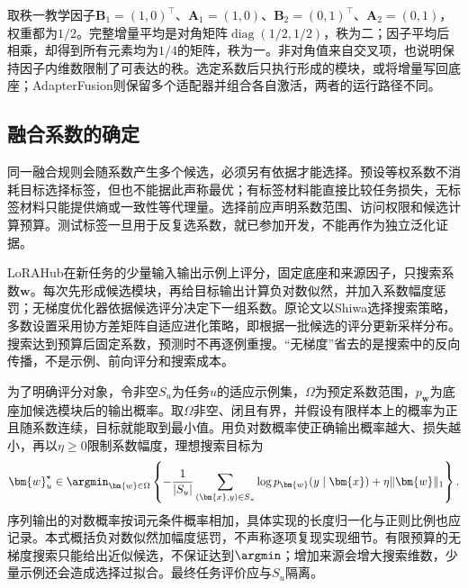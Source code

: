 取秩一教学因子$\bm{B}_1=(1,0)^\top$、$\bm{A}_1=(1,0)$、$\bm{B}_2=(0,1)^\top$、$\bm{A}_2=(0,1)$，权重都为$1/2$。完整增量平均是对角矩阵$\operatorname{diag}(1/2,1/2)$，秩为二；因子平均后相乘，却得到所有元素均为$1/4$的矩阵，秩为一。非对角值来自交叉项，也说明保持因子内维数限制了可表达的秩。选定系数后只执行形成的模块，或将增量写回底座；AdapterFusion则保留多个适配器并组合各自激活，两者的运行路径不同。

\subsection{融合系数的确定}
\label{sec:ket-integration-coefficients}

同一融合规则会随系数产生多个候选，必须另有依据才能选择。预设等权系数不消耗目标选择标签，但也不能据此声称最优；有标签材料能直接比较任务损失，无标签材料只能提供熵或一致性等代理量。选择前应声明系数范围、访问权限和候选计算预算。测试标签一旦用于反复选系数，就已参加开发，不能再作为独立泛化证据。

LoRAHub在新任务的少量输入输出示例上评分，固定底座和来源因子，只搜索系数$\bm{w}$。每次先形成候选模块，再给目标输出计算负对数似然，并加入系数幅度惩罚；无梯度优化器依据候选评分决定下一组系数。原论文以Shiwa选择搜索策略，多数设置采用协方差矩阵自适应进化策略，即根据一批候选的评分更新采样分布。搜索达到预算后固定系数，预测时不再逐例重搜。“无梯度”省去的是搜索中的反向传播，不是示例、前向评分和搜索成本。

为了明确评分对象，令非空$S_u$为任务$u$的适应示例集，$\Omega$为预定系数范围，$p_{\bm{w}}$为底座加候选模块后的输出概率。取$\Omega$非空、闭且有界，并假设有限样本上的概率为正且随系数连续，目标就能取到最小值。用负对数概率使正确输出概率越大、损失越小，再以$\eta\geq0$限制系数幅度，理想搜索目标为
\begin{equation}
  \bm{w}_u^\star\in\argmin_{\bm{w}\in\Omega}
   \left\{-\frac{1}{|S_u|}
   \sum_{(\bm{x},y)\in S_u}\log p_{\bm{w}}(y\mid\bm{x})
   +\eta\lVert\bm{w}\rVert_1\right\}.
  \label{eq:ket-integration-lorahub-search}
\end{equation}
序列输出的对数概率按词元条件概率相加，具体实现的长度归一化与正则比例也应记录。本式概括负对数似然加幅度惩罚，不声称逐项复现实现细节。有限预算的无梯度搜索只能给出近似候选，不保证达到$\argmin$；增加来源会增大搜索维数，少量示例还会造成选择过拟合。最终任务评价应与$S_u$隔离。

